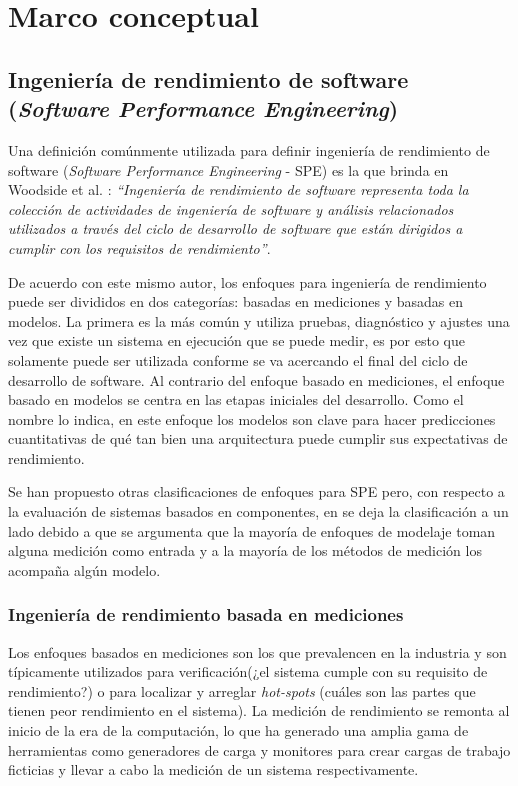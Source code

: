 
\section{Marco conceptual}

\subsection{Ingeniería de rendimiento de software (\emph{Software Performance Engineering})}
Una definición comúnmente utilizada para definir ingeniería de rendimiento de software  (\emph{Software Performance Engineering} - SPE)  es la que brinda en Woodside et al. \cite{4221619}: \textit{``Ingeniería de rendimiento de software representa toda la colección de actividades de ingeniería de software y análisis relacionados utilizados a través del ciclo de desarrollo de software que están dirigidos a cumplir con los requisitos de rendimiento''}. 

De acuerdo con este mismo autor, los enfoques para ingeniería de rendimiento puede ser divididos en dos categorías: basadas en mediciones y basadas en modelos. La primera es la más común y utiliza pruebas, diagnóstico y ajustes una vez que existe un sistema en ejecución que se puede medir, es por esto que solamente puede ser utilizada conforme se va acercando el final del ciclo de desarrollo de software. Al contrario del enfoque basado en mediciones, el enfoque basado en modelos se centra en las etapas iniciales del desarrollo. Como el nombre lo indica, en este enfoque los modelos son clave para hacer predicciones cuantitativas de qué tan bien una arquitectura puede cumplir sus expectativas de rendimiento.

Se han propuesto otras clasificaciones de enfoques para SPE pero, con respecto a la evaluación de sistemas basados en componentes, en \cite{Koziolek:2010:PEC:1808359.1808729} se deja la clasificación a un lado debido a que se argumenta que la mayoría de enfoques de modelaje toman alguna medición como entrada y a la mayoría de los métodos de medición los acompaña algún modelo.

\subsubsection{Ingeniería de rendimiento basada en mediciones}
Los enfoques basados en mediciones son los que prevalencen en la industria\cite{Gooijer2011PerformanceMO} y son típicamente utilizados para verificación(¿el sistema cumple con su requisito de rendimiento?) o para localizar y arreglar \emph{hot-spots} (cuáles son las partes que tienen peor rendimiento en el sistema). La medición de rendimiento se remonta al inicio de la era de la computación, lo que ha generado una amplia gama de herramientas como generadores de carga y monitores para crear cargas de trabajo ficticias y llevar a cabo la medición de un sistema respectivamente.

